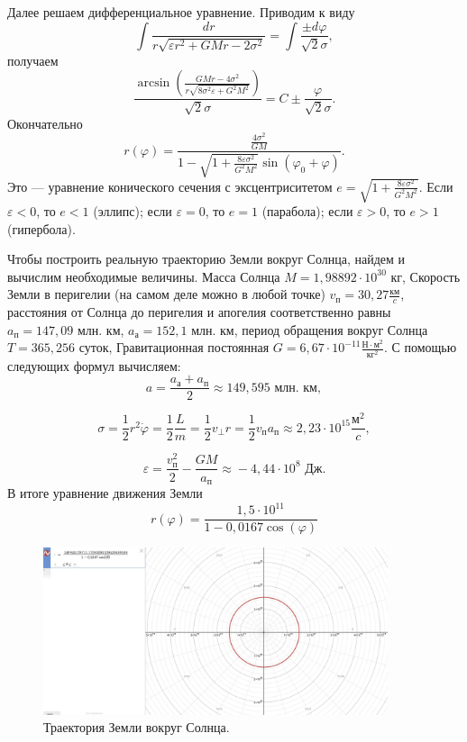 \documentclass[a4paper]{article}
\begin{document}
Далее решаем дифференциальное уравнение. Приводим к виду
\[
\int{\frac{dr}{r\sqrt{\varepsilon r^2 + GMr - 2\sigma^2}}} = \int{\frac{\pm d\varphi}{\sqrt{2}\sigma}},
\]
получаем
\[
\frac{\arcsin{(\frac{GMr-4\sigma^2}{r\sqrt{8\sigma^2 \varepsilon+G^2 M^2}})}}{\sqrt{2}\sigma} = C \pm \frac{\varphi} {\sqrt{2}\sigma}.
\]
Окончательно
\begin{equation} \tag{4}
r(\varphi) = \frac{\frac{4\sigma^2} {GM}}{1 - \sqrt{1 + \frac{8\varepsilon\sigma^2}{G^2 M^2}} \sin{(\varphi_0 + \varphi)}}.
\end{equation}
Это — уравнение конического сечения с эксцентриситетом $e = \sqrt{1 + \frac{8\varepsilon\sigma^2}{G^2 M^2}}$.
Если $\varepsilon < 0$, то $ e < 1$ (эллипс); если $\varepsilon = 0$, то  $ e = 1$ (парабола); если $\varepsilon > 0$,
то $ e > 1$ (гипербола). 

Чтобы построить реальную траекторию Земли вокруг Солнца, найдем и вычислим необходимые величины.  Масса Солнца $M = 1,98892\cdot10^{30}  \text{ кг}$, Скорость Земли в перигелии (на самом деле можно в любой точке) $v_{п} = 30,27  \frac{\text{км}}{c}$, расстояния от Солнца до перигелия и апогелия соответственно равны $a_{\text{п}} = 147,09 \text{ млн. км}$, $a_{\text{а}} = 152,1 \text{ млн. км}$, период обращения вокруг Солнца $T = 365,256 \text{ суток}$, Гравитационная постоянная $G = 6,67 \cdot 10^{-11}  \frac {\text{Н} \cdot \text{м}^2}{\text{кг}^2} $. С помощью следующих формул вычисляем:
\[
a = \frac{a_{\text{а}} + a_{\text{п}}}{2} \stackrel{}{\approx} 149,595 \text{ млн. км},
\]

\[
\sigma = \frac{1}{2} r^2 \dot{\varphi}= \frac{1}{2} \frac{L}{m} = \frac{1}{2} v_{\perp} r = \frac{1}{2} v_{\text{п}} a_{\text{п}} \stackrel{}{\approx} 2,23 \cdot 10^{15}  \frac{\text{м}^2}{c},
\]

\[
\varepsilon = \frac{v_{\text{п}}^2}{2} - \frac{GM}{a_{\text{п}}} \stackrel{}{\approx} -4,44 \cdot 10^8 \text{ Дж}.
\]
В итоге уравнение движения Земли
\[
r(\varphi) = \frac{1,5 \cdot 10^{11}}{1-0,0167\cos(\varphi)}
\]

\begin{figure}[h!]
    \centering
    \includegraphics[width=0.9\textwidth]{Ellipse1.jpg}
    \caption{Траектория Земли вокруг Солнца.}
\end{figure}
\end{document}

